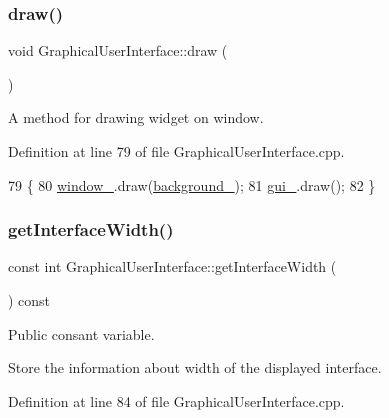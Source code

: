 \mbox{\label{classGraphicalUserInterface_a268c54faf6a8ac32628c60495900ea1c}} 
\subsubsection{\texorpdfstring{draw()}{draw()}}
{\footnotesize\ttfamily void Graphical\+User\+Interface\+::draw (\begin{DoxyParamCaption}{ }\end{DoxyParamCaption})}



A method for drawing widget on window. 



Definition at line 79 of file Graphical\+User\+Interface.\+cpp.


\begin{DoxyCode}
79                                   \{
80     \hyperlink{classGraphicalUserInterface_ae51adeb759a97196eda3b37bfc80a452}{window\_}.draw(\hyperlink{classGraphicalUserInterface_a6d706ef82ec59d143a009331b40681bb}{background\_});
81     \hyperlink{classGraphicalUserInterface_ab07abda0fdb8e2965b70d2024fa3cf20}{gui\_}.draw();
82 \}
\end{DoxyCode}
\mbox{\label{classGraphicalUserInterface_a6b168726ffb57ba7d06946d27435abad}} 
\subsubsection{\texorpdfstring{get\+Interface\+Width()}{getInterfaceWidth()}}
{\footnotesize\ttfamily const int Graphical\+User\+Interface\+::get\+Interface\+Width (\begin{DoxyParamCaption}{ }\end{DoxyParamCaption}) const}



Public consant variable. 

Store the information about width of the displayed interface. 

Definition at line 84 of file Graphical\+User\+Interface.\+cpp.


